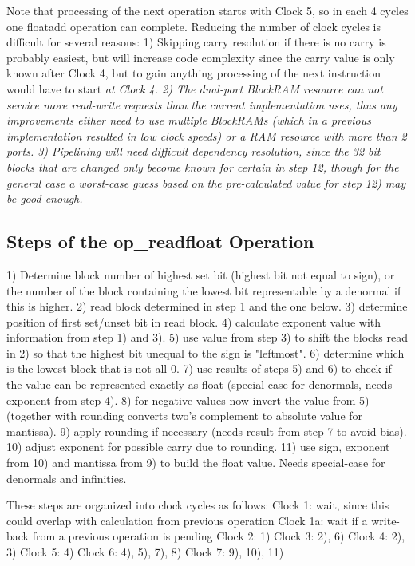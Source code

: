 Note that processing of the next operation starts with Clock 5, so in
each 4 cycles one floatadd operation can complete.
Reducing the number of clock cycles is difficult for several reasons:
1) Skipping carry resolution if there is no carry is probably easiest, but
   will increase code complexity since the carry value is only known after
   Clock 4, but to gain anything processing of the next instruction would
   have to start \em at \rm Clock 4.
2) The dual-port BlockRAM resource can not service more read-write requests
   than the current implementation uses, thus any improvements either need
   to use multiple BlockRAMs (which in a previous implementation resulted in
   low clock speeds) or a RAM resource with more than 2 ports.
3) Pipelining will need difficult dependency resolution, since the 32 bit blocks
   that are changed only become known for certain in step 12, though for the
   general case a worst-case guess based on the pre-calculated value for step
   12) may be good enough.

\subsection{Steps of the op\_readfloat Operation}

 1) Determine block number of highest set bit (highest bit not equal to sign),
    or the number of the block containing the lowest bit representable by a
    denormal if this is higher.
 2) read block determined in step 1 and the one below.
 3) determine position of first set/unset bit in read block.
 4) calculate exponent value with information from step 1) and 3).
 5) use value from step 3) to shift the blocks read in 2) so that the highest
    bit unequal to the sign is "leftmost".
 6) determine which is the lowest block that is not all 0.
 7) use results of steps 5) and 6) to check if the value can be represented
    exactly as float (special case for denormals, needs exponent from step 4).
 8) for negative values now invert the value from 5) (together with rounding
    converts two's complement to absolute value for mantissa).
 9) apply rounding if necessary (needs result from step 7 to avoid bias).
10) adjust exponent for possible carry due to rounding.
11) use sign, exponent from 10) and mantissa from 9) to build the float value.
    Needs special-case for denormals and infinities.

These steps are organized into clock cycles as follows:
Clock 1: wait, since this could overlap with calculation from previous operation
Clock 1a: wait if a write-back from a previous operation is pending
Clock 2: 1)
Clock 3: 2), 6)
Clock 4: 2), 3)
Clock 5: 4)
Clock 6: 4), 5), 7), 8)
Clock 7: 9), 10), 11)

